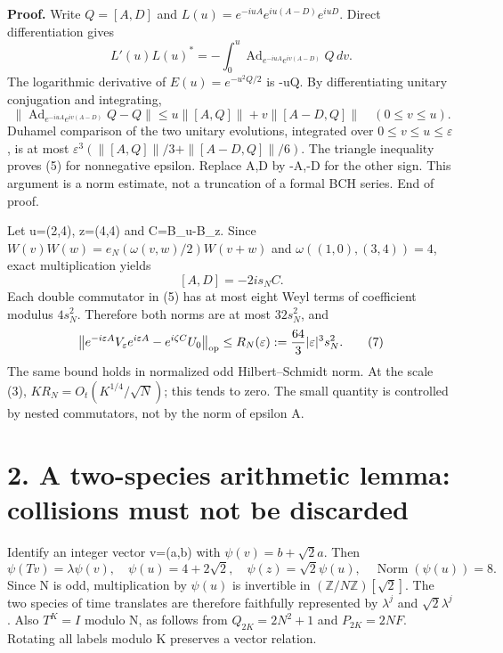 \documentclass[11pt,a4paper]{article}
\begin{document}
\textbf{Proof.} Write \(Q=[A,D]\) and \(L(u)=e^{-iuA}e^{iu(A-D)}e^{iuD}\). Direct differentiation gives \[
 L'(u)L(u)^*=-\int_0^u
       \operatorname{Ad}_{e^{-iuA}e^{iv(A-D)}}Q\,dv.
\] The logarithmic derivative of \(E(u)=e^{-u^2Q/2}\) is -uQ. By differentiating unitary conjugation and integrating, \[
 \|\operatorname{Ad}_{e^{-iuA}e^{iv(A-D)}}Q-Q\|
 \leq u\|[A,Q]\|+v\|[A-D,Q]\|\quad(0\leq v\leq u).
\] Duhamel comparison of the two unitary evolutions, integrated over \(0\leq v\leq u\leq\varepsilon\), is at most \(\varepsilon^3(\|[A,Q]\|/3+\|[A-D,Q]\|/6)\). The triangle inequality proves (5) for nonnegative epsilon. Replace A,D by -A,-D for the other sign. This argument is a norm estimate, not a truncation of a formal BCH series. End of proof.

Let u=(2,4), z=(4,4) and C=B\_u-B\_z. Since \(W(v)W(w)=e_N(\omega(v,w)/2)W(v+w)\) and \(\omega((1,0),(3,4))=4\), exact multiplication yields \[
 [A,D]=-2i s_N C.                                             \tag{6}
\] Each double commutator in (5) has at most eight Weyl terms of coefficient modulus \(4s_N^2\). Therefore both norms are at most \(32s_N^2\), and \[
 \left\|e^{-i\varepsilon A}V_\varepsilon e^{i\varepsilon A}
                  -e^{i\zeta C}U_0\right\|_{\rm op}
 \leq R_N(\varepsilon):=\frac{64}{3}|\varepsilon|^3s_N^2.        \tag{7}
\] The same bound holds in normalized odd Hilbert--Schmidt norm. At the scale (3), \(KR_N=O_t(K^{1/4}/\sqrt N)\); this tends to zero. The small quantity is controlled by nested commutators, not by the norm of epsilon A.

\hypertarget{a-two-species-arithmetic-lemma-collisions-must-not-be-discarded}{%
\section{2. A two-species arithmetic lemma: collisions must not be discarded}\label{a-two-species-arithmetic-lemma-collisions-must-not-be-discarded}}

Identify an integer vector v=(a,b) with \(\psi(v)=b+\sqrt2 a\). Then \[
 \psi(Tv)=\lambda\psi(v),\quad
 \psi(u)=4+2\sqrt2,\quad \psi(z)=\sqrt2\psi(u),\quad
 \operatorname{Norm}(\psi(u))=8.
\] Since N is odd, multiplication by \(\psi(u)\) is invertible in \((\mathbb Z/N\mathbb Z)[\sqrt2]\). The two species of time translates are therefore faithfully represented by \(\lambda^j\) and \(\sqrt2\lambda^j\). Also \(T^K=I\) modulo N, as follows from \(Q_{2K}=2N^2+1\) and \(P_{2K}=2NF\). Rotating all labels modulo K preserves a vector relation.
\end{document}
